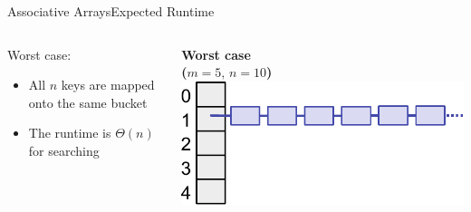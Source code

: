 \begin{frame}{Associative Arrays}{Expected Runtime}
  \begin{columns}
    \begin{column}{0.4\linewidth}
      {\color{MainA}Worst case}:
      \begin{itemize}
        \item
          All {\color{MainA}$n$} keys are mapped onto the same bucket
        \item
          The runtime is {\color{MainA}$\Theta(n)$} for searching
      \end{itemize}
    \end{column}
    \begin{column}{0.5\linewidth}
      \begin{center}
        \textbf{Worst case}\\
        \textbf{($m = 5, \, n = 10$)}\\[1em]
        \includegraphics[height=0.4\textheight]{Images/hash-extreme.pdf}
        \label{tab:hash_table:runtime_worst_case}
      \end{center}
    \end{column}
  \end{columns}
\end{frame}

